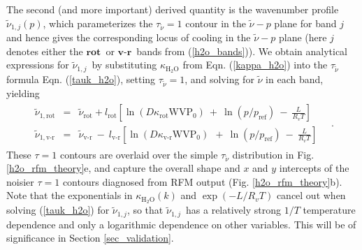 \documentclass{ametsoc}
\newcommand{\beqa}{\begin{eqnarray}}
\newcommand{\eeqa}{\end{eqnarray}}
\newcommand{\eqnref}[1]{(\ref{#1})}
\newcommand{\Rv}{\ensuremath{R_v}}
\newcommand{\htwo}{\ensuremath{\mathrm{H_2O}}}
\newcommand{\wv}{\ensuremath{\widetilde{\nu}}}
\newcommand{\tauk}{\ensuremath{\tau_{\wv}}}
\newcommand{\pref}{\ensuremath{p_{\mathrm{ref}}}}
\newcommand{\WVP}{\ensuremath{\mathrm{WVP}}}
\newcommand{\kapparot}{\ensuremath{\kappa_{\mathrm{rot}}}}
\newcommand{\kappavr}{\ensuremath{\kappa_{\text{v-r}}}}
\newcommand{\krot}{\ensuremath{\wv_\mathrm{rot}}}
\newcommand{\kvr}{\ensuremath{\wv_\text{v-r}}}
\newcommand{\konerot}{\ensuremath{\wv_{1,\mathrm{rot}}}}
\newcommand{\konevr}{\ensuremath{\wv_{1,\text{v-r}}}}
\newcommand{\konej}{\ensuremath{\wv_{1,j}}}
\newcommand{\lrot}{\ensuremath{l_\mathrm{rot}}}
\newcommand{\lvr}{\ensuremath{l_\text{v-r}}}
\newcommand{\vr}{\ensuremath{\textbf{v-r}}}
\newcommand{\rot}{\ensuremath{\textbf{rot}}}
\begin{document}
The second (and more important) derived quantity is the wavenumber profile $\konej(p)$, which parameterizes the $\tauk=1$ contour in the $\wv-p$ plane for band $j$ and hence gives the corresponding locus of cooling in the $\wv-p$ plane (here $j$ denotes either the \rot\ or \vr\  bands from \eqnref{h2o_bands}). We obtain analytical expressions for \konej\  by substituting $\kappa_{\htwo}$ from  Eqn.  \eqnref{kappa_h2o} into the $\tauk$ formula Eqn. \eqnref{tauk_h2o}, setting $\tauk=1$, and solving for $\wv$ in each band, yielding
 \beqa
	\begin{split}
	 	\konerot & = & \krot + \lrot\left[\ln(D\kapparot \WVP_0) \    + \ \ln(p/\pref) \  - \ \frac{L}{\Rv T} \right]  \\ 
		\konevr  & = &  \kvr \ - \ \lvr\left[\ln(D\kappavr \WVP_0) \ \  + \ \ln(p/\pref) \  - \ \frac{L}{\Rv T} \right]   
	\end{split} \quad .
	\label{k1_theory}
\eeqa
These $\tau=1$ contours  are overlaid over the simple $\tauk$ distribution in Fig. \ref{h2o_rfm_theory}e, and capture the overall shape and $x$ and $y$ intercepts of the noisier $\tau=1$ contours diagnosed from RFM output (Fig. \ref{h2o_rfm_theory}b). Note that the exponentials in $\kappa_{\htwo}(k)$ and $\exp(-L/\Rv T)$ cancel out when solving \eqnref{tauk_h2o} for \konej, so that  \konej\ has a relatively strong $1/T$ temperature dependence and only a logarithmic dependence on other variables. This will be of significance in Section \ref{sec_validation}.
\end{document}
